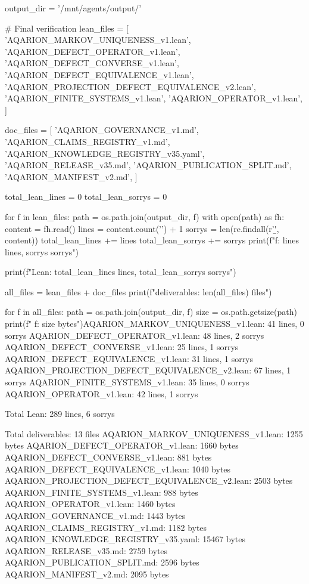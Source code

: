 output_dir = '/mnt/agents/output/'

# Final verification
lean_files = [
    'AQARION_MARKOV_UNIQUENESS_v1.lean',
    'AQARION_DEFECT_OPERATOR_v1.lean',
    'AQARION_DEFECT_CONVERSE_v1.lean',
    'AQARION_DEFECT_EQUIVALENCE_v1.lean',
    'AQARION_PROJECTION_DEFECT_EQUIVALENCE_v2.lean',
    'AQARION_FINITE_SYSTEMS_v1.lean',
    'AQARION_OPERATOR_v1.lean',
]

doc_files = [
    'AQARION_GOVERNANCE_v1.md',
    'AQARION_CLAIMS_REGISTRY_v1.md',
    'AQARION_KNOWLEDGE_REGISTRY_v35.yaml',
    'AQARION_RELEASE_v35.md',
    'AQARION_PUBLICATION_SPLIT.md',
    'AQARION_MANIFEST_v2.md',
]

total_lean_lines = 0
total_lean_sorrys = 0

for f in lean_files:
    path = os.path.join(output_dir, f)
    with open(path) as fh:
        content = fh.read()
        lines = content.count('\n') + 1
        sorrys = len(re.findall(r'\bsorry\b', content))
        total_lean_lines += lines
        total_lean_sorrys += sorrys
        print(f"{f}: {lines} lines, {sorrys} sorrys")

print(f"\nTotal Lean: {total_lean_lines} lines, {total_lean_sorrys} sorrys")

all_files = lean_files + doc_files
print(f"\nTotal deliverables: {len(all_files)} files")

for f in all_files:
    path = os.path.join(output_dir, f)
    size = os.path.getsize(path)
    print(f"  {f}: {size} bytes")AQARION_MARKOV_UNIQUENESS_v1.lean: 41 lines, 0 sorrys
AQARION_DEFECT_OPERATOR_v1.lean: 48 lines, 2 sorrys
AQARION_DEFECT_CONVERSE_v1.lean: 25 lines, 1 sorrys
AQARION_DEFECT_EQUIVALENCE_v1.lean: 31 lines, 1 sorrys
AQARION_PROJECTION_DEFECT_EQUIVALENCE_v2.lean: 67 lines, 1 sorrys
AQARION_FINITE_SYSTEMS_v1.lean: 35 lines, 0 sorrys
AQARION_OPERATOR_v1.lean: 42 lines, 1 sorrys

Total Lean: 289 lines, 6 sorrys

Total deliverables: 13 files
  AQARION_MARKOV_UNIQUENESS_v1.lean: 1255 bytes
  AQARION_DEFECT_OPERATOR_v1.lean: 1660 bytes
  AQARION_DEFECT_CONVERSE_v1.lean: 881 bytes
  AQARION_DEFECT_EQUIVALENCE_v1.lean: 1040 bytes
  AQARION_PROJECTION_DEFECT_EQUIVALENCE_v2.lean: 2503 bytes
  AQARION_FINITE_SYSTEMS_v1.lean: 988 bytes
  AQARION_OPERATOR_v1.lean: 1460 bytes
  AQARION_GOVERNANCE_v1.md: 1443 bytes
  AQARION_CLAIMS_REGISTRY_v1.md: 1182 bytes
  AQARION_KNOWLEDGE_REGISTRY_v35.yaml: 15467 bytes
  AQARION_RELEASE_v35.md: 2759 bytes
  AQARION_PUBLICATION_SPLIT.md: 2596 bytes
  AQARION_MANIFEST_v2.md: 2095 bytes

